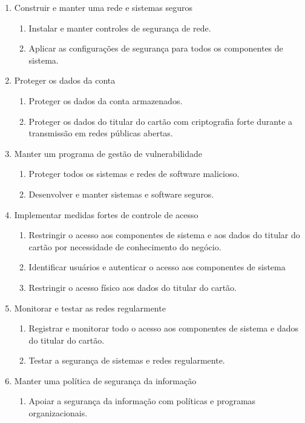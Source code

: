     \begin{enumerate}
        \item Construir e manter uma rede e sistemas seguros
            \begin{enumerate}
            \item Instalar e manter controles de segurança de rede. 
            \item Aplicar as configurações de segurança para todos os componentes de sistema.
            \end{enumerate}

        \item Proteger os dados da conta
            \begin{enumerate}
            \item Proteger os dados da conta armazenados.
            \item Proteger os dados do titular do cartão com criptografia forte durante a transmissão em redes públicas abertas.
            \end{enumerate}

        \item Manter um programa de gestão de vulnerabilidade
            \begin{enumerate}
            \item Proteger todos os sistemas e redes de software malicioso.
            \item Desenvolver e manter sistemas e software seguros.
            \end{enumerate}

        \item Implementar medidas fortes de controle de acesso
            \begin{enumerate}
            \item Restringir o acesso aos componentes de sistema e aos dados do titular do cartão por necessidade de conhecimento do negócio.
            \item Identificar usuários e autenticar o acesso aos componentes de sistema
            \item Restringir o acesso físico aos dados do titular do cartão.
            \end{enumerate}

        \item Monitorar e testar as redes regularmente
            \begin{enumerate}
            \item Registrar e monitorar todo o acesso aos componentes de sistema e dados do titular do cartão.
            \item Testar a segurança de sistemas e redes regularmente.
            \end{enumerate}

        \item Manter uma política de segurança da informação
            \begin{enumerate}
            \item Apoiar a segurança da informação com políticas e programas organizacionais.
            \end{enumerate}
    \end{enumerate}

